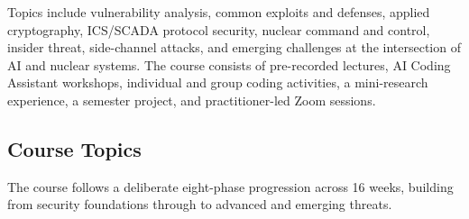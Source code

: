 \documentclass[9pt]{extarticle}
\begin{document}
\medskip

Topics include vulnerability analysis, common exploits and defenses, applied
cryptography, ICS/SCADA protocol security, nuclear command and control,
insider threat, side-channel attacks, and emerging challenges at the intersection
of AI and nuclear systems. The course consists of pre-recorded lectures,
AI Coding Assistant workshops, individual and group coding activities, a mini-research
experience, a semester project, and practitioner-led Zoom sessions.

\subsection*{Course Topics}

The course follows a deliberate eight-phase progression across 16 weeks,
building from security foundations through to advanced and emerging threats.

\medskip
\end{document}
